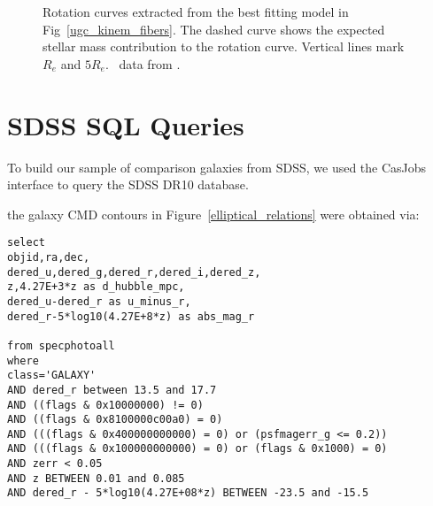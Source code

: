 \documentclass{emulateapj}
\newcommand\HI{\ion{H}{1}}
\begin{document}
\begin{figure*}
\caption{Rotation curves extracted from the best fitting model in Fig~\ref{ugc_kinem_fibers}.  The dashed curve shows the expected stellar mass contribution to the rotation curve.  Vertical lines mark $R_e$ and $5R_e$.  \HI\ data from \citet{Pickering97}. \label{ugc_kinem}}
\end{figure*}




\clearpage

\appendix
\section{SDSS SQL Queries} \label{SQL}
To build our sample of comparison galaxies from SDSS, we used the CasJobs interface to query the SDSS DR10 database.


the galaxy CMD contours in Figure~\ref{elliptical_relations} were obtained via:
\begin{verbatim}
select 
objid,ra,dec,
dered_u,dered_g,dered_r,dered_i,dered_z,
z,4.27E+3*z as d_hubble_mpc,
dered_u-dered_r as u_minus_r,
dered_r-5*log10(4.27E+8*z) as abs_mag_r 

from specphotoall
where
class='GALAXY'
AND dered_r between 13.5 and 17.7
AND ((flags & 0x10000000) != 0)
AND ((flags & 0x8100000c00a0) = 0)
AND (((flags & 0x400000000000) = 0) or (psfmagerr_g <= 0.2))
AND (((flags & 0x100000000000) = 0) or (flags & 0x1000) = 0)
AND zerr < 0.05
AND z BETWEEN 0.01 and 0.085
AND dered_r - 5*log10(4.27E+08*z) BETWEEN -23.5 and -15.5
\end{verbatim}
\end{document}
